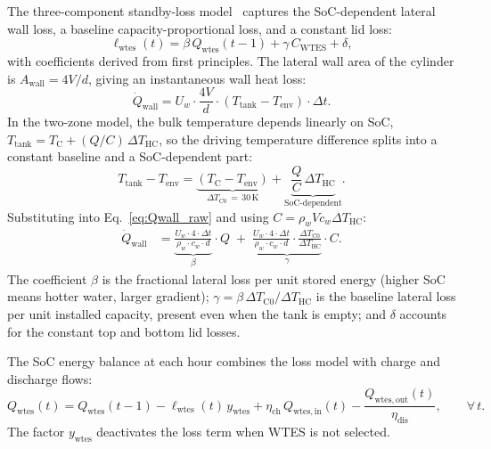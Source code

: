 \documentclass[11pt,a4paper]{report}
\begin{document}
The three-component standby-loss model~\cite{Krien2020oemofsolph} captures the
SoC-dependent lateral wall loss, a baseline capacity-proportional loss, and a
constant lid loss:
\begin{equation}
    \ell_\mathrm{wtes}(t) = \beta\,Q_\mathrm{wtes}(t-1)
                           + \gamma\,C_\mathrm{WTES}
                           + \delta,
    \label{eq:wtes_loss}
\end{equation}
with coefficients derived from first principles.
The lateral wall area of the cylinder is $A_\mathrm{wall} = 4V/d$, giving an
instantaneous wall heat loss:
\begin{equation}
    \dot{Q}_\mathrm{wall} = U_w \cdot \frac{4V}{d} \cdot (T_\mathrm{tank} - T_\mathrm{env}) \cdot \Delta t.
    \label{eq:Qwall_raw}
\end{equation}
In the two-zone model, the bulk temperature depends linearly on SoC,
$T_\mathrm{tank} = T_\mathrm{C} + (Q/C)\,\Delta T_\mathrm{HC}$, so the
driving temperature difference splits into a constant baseline and a
SoC-dependent part:
\begin{equation}
    T_\mathrm{tank} - T_\mathrm{env}
        = \underbrace{(T_\mathrm{C} - T_\mathrm{env})}_{\Delta T_\mathrm{C0}\,=\,30\,\mathrm{K}}
        + \underbrace{\frac{Q}{C}\,\Delta T_\mathrm{HC}}_{\text{SoC-dependent}}.
    \label{eq:dT_split}
\end{equation}
Substituting into Eq.~\eqref{eq:Qwall_raw} and using $C = \rho_w V c_w \Delta T_\mathrm{HC}$:
\begin{align}
    \dot{Q}_\mathrm{wall}
        &= \underbrace{\frac{U_w \cdot 4 \cdot \Delta t}{\rho_w \cdot c_w \cdot d}}_{\displaystyle\beta} \cdot Q
          \;+\;
           \underbrace{\frac{U_w \cdot 4 \cdot \Delta t}{\rho_w \cdot c_w \cdot d} \cdot \frac{\Delta T_\mathrm{C0}}{\Delta T_\mathrm{HC}}}_{\displaystyle\gamma} \cdot C.
    \label{eq:betagamma_derived}
\end{align}
The coefficient $\beta$ is the fractional lateral loss per unit stored energy
(higher SoC means hotter water, larger gradient);
$\gamma = \beta\,\Delta T_\mathrm{C0}/\Delta T_\mathrm{HC}$ is the baseline lateral
loss per unit installed capacity, present even when the tank is empty;
and $\delta$ accounts for the constant top and bottom lid losses.

The SoC energy balance at each hour combines the loss model with charge and
discharge flows:
\begin{equation}
    Q_\mathrm{wtes}(t) = Q_\mathrm{wtes}(t-1)
        - \ell_\mathrm{wtes}(t)\,y_\mathrm{wtes}
        + \eta_\mathrm{ch}\,Q_\mathrm{wtes,in}(t)
        - \frac{Q_\mathrm{wtes,out}(t)}{\eta_\mathrm{dis}},
    \qquad \forall\,t.
    \label{eq:wtes_dyn}
\end{equation}
The factor $y_\mathrm{wtes}$ deactivates the loss term when WTES is not selected.
\end{document}
